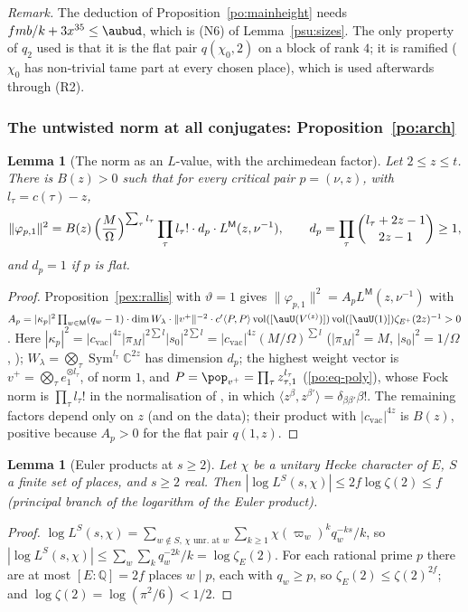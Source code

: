 \documentclass[10pt]{amsart}
\newtheorem{lemma}[theorem]{Lemma}
\theoremstyle{definition}
\theoremstyle{remark}
\newcommand{\C}{\mathbb C}
\newcommand{\Q}{\mathbb Q}
\begin{document}
\emph{Remark.} The deduction of Proposition~\ref{po:mainheight} needs $fmb/k+3x^{35}\le\aubud$, which is (N6) of Lemma~\ref{psu:sizes}. The only property of $q_2$ used is that it is the flat pair $q(\chi_0,2)$ on a block
of rank $4$; it is ramified ($\chi_0$ has non-trivial tame part at every chosen place), which is used
afterwards through (R2).

\subsubsection{The untwisted norm at all conjugates: Proposition~\ref{po:arch}}\label{psu:ss-arch}

\begin{lemma}[The norm as an $L$-value, with the archimedean factor]\label{psu:normL}
Let $2\le z\le t$. There is $B(z)>0$ such that for every critical pair $p=(\nu,z)$, with
$l_\tau=c(\tau)-z$,
\[
\|\varphi_{p,1}\|^2=B(z)\,\Bigl(\frac M\Omega\Bigr)^{\sum_\tau l_\tau}\prod_\tau l_\tau!\cdot d_p\cdot
L^{\mathsf M}(z,\nu^{-1}),\qquad d_p=\prod_\tau\binom{l_\tau+2z-1}{2z-1}\ge1,
\]
and $d_p=1$ if $p$ is flat.
\end{lemma}
\begin{proof}
Proposition~\ref{pex:rallis} with $\vartheta=1$ gives $\|\varphi_{p,1}\|^2=A_pL^{\mathsf M}(z,\nu^{-1})$ with
$A_p=|\kappa_p|^2\prod_{w\in\mathsf M}(q_w-1)\cdot\dim W_\lambda\cdot\|v^+\|^{-2}\cdot c'\langle P,P\rangle
\operatorname{vol}([\auU(V^{(z)})])\operatorname{vol}([\auU(1)])\zeta_{E^+}(2z)^{-1}>0$. Here
$|\kappa_p|^2=|c_{\mathrm{vac}}|^{4z}|\pi_M|^{2\sum l}|s_0|^{2\sum l}=|c_{\mathrm{vac}}|^{4z}(M/\Omega)^{\sum l}$
($|\pi_M|^2=M$, $|s_0|^2=1/\Omega$, {\cite[\S5.1.1]{P49}}); $W_\lambda=\bigotimes_\tau\operatorname{Sym}^{l_\tau}
\C^{2z}$ has dimension $d_p$; the highest weight vector is $v^+=\bigotimes_\tau e_1^{\otimes l_\tau}$, of norm $1$,
and $P=\pop_{v^+}=\prod_\tau z_{\tau,1}^{l_\tau}$ (\eqref{po:eq-poly}), whose Fock norm is $\prod_\tau l_\tau!$
in the normalisation of {\cite[(33)]{P49}}, in which $\langle z^\beta,z^{\beta'}\rangle=\delta_{\beta
\beta'}\beta!$. The remaining factors depend only on $z$ (and on the data); their product with
$|c_{\mathrm{vac}}|^{4z}$ is $B(z)$, positive because $A_p>0$ for the flat pair $q(1,z)$.
\end{proof}

\begin{lemma}[Euler products at $s\ge2$]\label{psu:euler}
Let $\chi$ be a unitary Hecke character of $E$, $S$ a finite set of places, and $s\ge2$ real. Then
$|\log L^S(s,\chi)|\le2f\log\zeta(2)\le f$ (principal branch of the logarithm of the Euler product).
\end{lemma}
\begin{proof}
$\log L^S(s,\chi)=\sum_{w\notin S,\,\chi\text{ unr.\ at }w}\sum_{k\ge1}\chi(\varpi_w)^kq_w^{-ks}/k$, so
$|\log L^S(s,\chi)|\le\sum_w\sum_kq_w^{-2k}/k=\log\zeta_E(2)$. For each rational prime $p$ there are at
most $[E:\Q]=2f$ places $w\mid p$, each with $q_w\ge p$, so $\zeta_E(2)\le\zeta(2)^{2f}$; and $\log\zeta(2)
=\log(\pi^2/6)<1/2$.
\end{proof}
\end{document}
